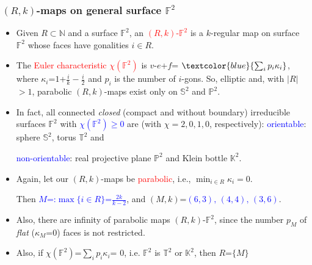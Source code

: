 \documentclass{beamer}
\begin{document}
\begin{frame}\frametitle{ $(R,k)$-maps on general surface $\mathbb{F}^2$
}
\vspace{-1mm}
\begin{itemize}

\item Given $R\subset \mathbb{N}$ and a surface $\mathbb{F}^2$, an
\textcolor{red}{$(R,k)$-$\mathbb{F}^2$} is
a $k$-regular map  on surface $\mathbb{F}^2$
whose faces have gonalities $i\in R$.

\item
The \textcolor{red}{Euler characteristic $\chi ({\mathbb{F}^2})$} is $v$-$e$+$f$=
$\textcolor{blue}{\sum_{i}p_i\kappa_i}$, 
where $\kappa_i$=$1$+$\frac{i}{k}-\frac{i}{2}$ and $p_i$ is the number of $i$-gons. So, elliptic and, with $|R|$$>$$1$,
 parabolic $(R,k)$-maps exist only on $\mathbb{S}^2$ and $\mathbb{P}^2$.

\item In fact, all connected {\em closed} (compact and without boundary) irreducible 
surfaces $\mathbb{F}^2$ with \textcolor{blue}{$\chi ({\mathbb{F}^2})$$\ge$$ 0$}
are (with $\chi=2,0,1,0$, 
respectively):
\textcolor{blue}{orientable}: sphere $\mathbb{S}^2$, torus $\mathbb{T}^2$ 
 and 
 
 \textcolor{blue}{non-orientable}:
real projective 
 plane
 $\mathbb{P}^2$ and Klein bottle $\mathbb{K}^2$.
\pause

\item
Again, let our $(R,k)$-maps be
\textcolor{red}{parabolic}, i.e.,
$\min_{i\in R}\kappa_i=0$.

Then  \textcolor{blue}{$M$=:$\max\{i\in R\}$=$\frac{2k}{k-2}$}, 
and $(M,k)$=\textcolor{blue}{$(6,3),\,(4,4),\,(3,6)$}.


\item Also, there are infinity of parabolic maps $(R,k)$-$\mathbb{F}^2$, since the number
$p_M$ of {\em flat} ($\kappa_M$=$0$) faces is not restricted.

\item  %
Also, if $\chi ({\mathbb{F}^2})$=${\sum_{i}p_i\kappa_i}$=
$0$, i.e.  ${\mathbb{F}^2}$ is $\mathbb{T}^2$ or $\mathbb{K}^2$, then $R$=$\{M\}$ 
\end{itemize}\end{frame}
\end{document}
